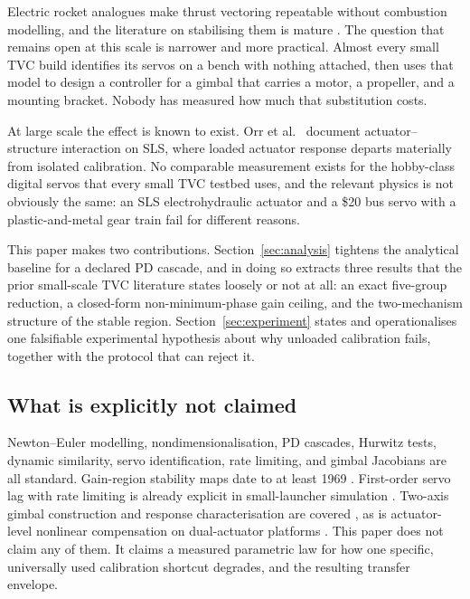 \documentclass[11pt,a4paper]{article}
\begin{document}
Electric rocket analogues make thrust vectoring repeatable without combustion modelling, and the
literature on stabilising them is mature \cite{spannagl2021,linsen2022,erocket2026,quadrocket2026}.
The question that remains open at this scale is narrower and more practical. Almost every small TVC
build identifies its servos on a bench with nothing attached, then uses that model to design a
controller for a gimbal that carries a motor, a propeller, and a mounting bracket. Nobody has
measured how much that substitution costs.

At large scale the effect is known to exist. Orr et al.\ \cite{orr2023} document actuator--structure
interaction on SLS, where loaded actuator response departs materially from isolated calibration. No
comparable measurement exists for the hobby-class digital servos that every small TVC testbed uses,
and the relevant physics is not obviously the same: an SLS electrohydraulic actuator and a
\$20 bus servo with a plastic-and-metal gear train fail for different reasons.

This paper makes two contributions. Section~\ref{sec:analysis} tightens the analytical baseline for
a declared PD cascade, and in doing so extracts three results that the prior small-scale TVC
literature states loosely or not at all: an exact five-group reduction, a closed-form
non-minimum-phase gain ceiling, and the two-mechanism structure of the stable region.
Section~\ref{sec:experiment} states and operationalises one falsifiable experimental hypothesis about
why unloaded calibration fails, together with the protocol that can reject it.

\subsection{What is explicitly not claimed}

Newton--Euler modelling, nondimensionalisation, PD cascades, Hurwitz tests, dynamic similarity,
servo identification, rate limiting, and gimbal Jacobians are all standard. Gain-region stability
maps date to at least 1969 \cite{jacqmein1969}. First-order servo lag with rate limiting is already
explicit in small-launcher simulation \cite{santos2024}. Two-axis gimbal construction and response
characterisation are covered \cite{singh2025,erocket2026}, as is actuator-level nonlinear
compensation on dual-actuator platforms \cite{pidnet2026,ddobs2026}. This paper does not claim any of
them. It claims a measured parametric law for how one specific, universally used calibration
shortcut degrades, and the resulting transfer envelope.
\end{document}
